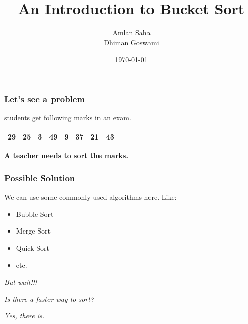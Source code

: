\documentclass[pdf]{beamer}
\title{An Introduction to Bucket Sort}
\author{Amlan Saha\\Dhiman Goswami}
\institute{Bangladesh University of Engineering and Technology\\Dhaka, Bangladesh}
\date{\today}
\begin{document}
\begin{frame}
\titlepage
\end{frame}

\begin{frame}
	\frametitle{Let's see a problem}
		 students get following marks in an exam.
		\pause
		\begin{table}[h]
			\centering
			\begin{tabular}{|c|c|c|c|c|c|c|c|}
				\hline
				29 & 25 & 3 & 49 & 9 & 37 & 21 & 43\\
				\hline
			\end{tabular}
		\end{table}
		\pause
		\textbf{A teacher needs to sort the marks.}		
\end{frame}

\begin{frame}
	\frametitle{Possible Solution}
	\pause
	We can use some commonly used algorithms here. Like:
	\pause
	\begin{itemize}
		\item Bubble Sort
		\pause
		\item Merge Sort
		\pause
		\item Quick Sort
		\pause
		\item etc.
	\end{itemize}
\end{frame}

\begin{frame}
	\begin{block}{
		\color{red}
		\textit{But wait!!!}}
	\end{block}
	\pause
	\begin{block}{
		\color{blue}
		\textit{Is there a faster way to sort?}}
	\end{block}

	\pause
	\begin{block}{
		\color{olivegreen}\textit{Yes, there is.}}
	\end{block}	
\end{frame}
\end{document}
